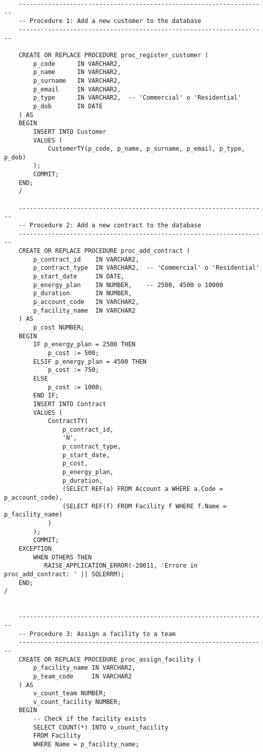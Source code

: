 \begin{lstlisting}
    --------------------------------------------------------------------
    -- Procedure 1: Add a new customer to the database
    --------------------------------------------------------------------
    
    CREATE OR REPLACE PROCEDURE proc_register_customer (
        p_code      IN VARCHAR2,
        p_name      IN VARCHAR2,
        p_surname   IN VARCHAR2,
        p_email     IN VARCHAR2,
        p_type      IN VARCHAR2,  -- 'Commercial' o 'Residential'
        p_dob       IN DATE
    ) AS
    BEGIN
        INSERT INTO Customer
        VALUES (
            CustomerTY(p_code, p_name, p_surname, p_email, p_type, p_dob)
        );
        COMMIT;
    END;
    /
    
    --------------------------------------------------------------------
    -- Procedure 2: Add a new contract to the database
    --------------------------------------------------------------------
    CREATE OR REPLACE PROCEDURE proc_add_contract (
        p_contract_id    IN VARCHAR2,
        p_contract_type  IN VARCHAR2,  -- 'Commercial' o 'Residential'
        p_start_date     IN DATE,
        p_energy_plan    IN NUMBER,    -- 2500, 4500 o 10000
        p_duration       IN NUMBER,    
        p_account_code   IN VARCHAR2,
        p_facility_name  IN VARCHAR2
    ) AS
        p_cost NUMBER;
    BEGIN
        IF p_energy_plan = 2500 THEN
            p_cost := 500;
        ELSIF p_energy_plan = 4500 THEN
            p_cost := 750;
        ELSE
            p_cost := 1000;
        END IF;
        INSERT INTO Contract
        VALUES (
            ContractTY(
                p_contract_id,
                'N',
                p_contract_type,
                p_start_date,
                p_cost,
                p_energy_plan,
                p_duration,
                (SELECT REF(a) FROM Account a WHERE a.Code = p_account_code),
                (SELECT REF(f) FROM Facility f WHERE f.Name = p_facility_name)
            )
        );
        COMMIT;
    EXCEPTION
        WHEN OTHERS THEN
           RAISE_APPLICATION_ERROR(-20011, 'Errore in proc_add_contract: ' || SQLERRM);
    END;
/

    
    --------------------------------------------------------------------
    -- Procedure 3: Assign a facility to a team
    --------------------------------------------------------------------
    CREATE OR REPLACE PROCEDURE proc_assign_facility (
        p_facility_name IN VARCHAR2,
        p_team_code     IN VARCHAR2
    ) AS
        v_count_team NUMBER;
        v_count_facility NUMBER;
    BEGIN
        -- Check if the facility exists
        SELECT COUNT(*) INTO v_count_facility
        FROM Facility
        WHERE Name = p_facility_name;
    

\end{lstlisting}
